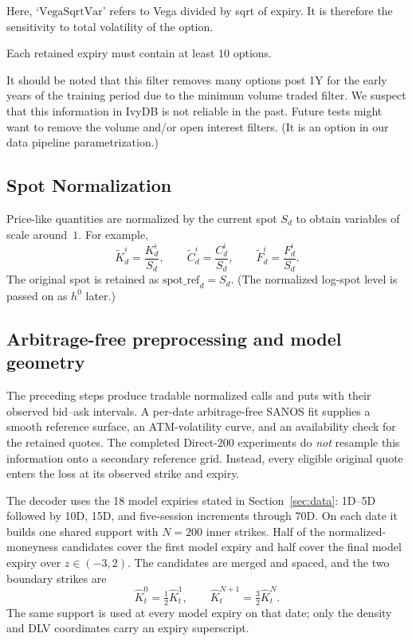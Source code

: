 \documentclass[11pt,a4paper]{article}
\begin{document}
Here, `$\mathrm{VegaSqrtVar}$' refers to Vega divided by sqrt of expiry. It is therefore
the sensitivity to total volatility of the option.

Each retained expiry must contain at least \(10\) options.

It should be noted that this filter removes many options post 1Y for the early years of the training period due to the minimum volume
traded filter. We suspect that this information in IvyDB is not reliable in the past.
Future tests might want to remove the volume and/or open interest filters. (It is an option
in our data pipeline parametrization.)

\subsection{Spot Normalization}

Price-like quantities are normalized by the current spot \(S_d\) to obtain
variables of scale around~$1$. For example,
%
\[
    \widetilde{K}_d^i
    =
    \frac{K_d^i}{S_d},
    \qquad
    \widetilde{C}_d^i
    =
    \frac{C_d^i}{S_d},
    \qquad
    \widetilde{F}_d^i
    =
    \frac{F_d^i}{S_d}.
\]
The original spot is retained as
$
    \mathrm{spot\_ref}_d = S_d.
$
(The normalized log-spot level is passed on as $h^0$ later.)

\subsection{Arbitrage-free preprocessing and model geometry}

The preceding steps produce tradable normalized calls and puts with their
observed bid--ask intervals.  A per-date arbitrage-free SANOS fit supplies a
smooth reference surface, an ATM-volatility curve, and an availability check
for the retained quotes.  The completed Direct-200 experiments do
\emph{not} resample this information onto a secondary reference grid.
Instead, every eligible original quote enters the loss at its observed strike
and expiry.

The decoder uses the 18 model expiries stated in Section~\ref{sec:data}:
1D--5D followed by 10D, 15D, and five-session increments through 70D.  On
each date it builds one shared support with $N=200$ inner strikes. Half of the normalized-moneyness
candidates cover the first model expiry and half cover the final model expiry
over $z\in(-3,2)$.  The candidates are merged and spaced, and the two boundary
strikes are
\[
  \hat K_t^0=\tfrac12\hat K_t^1,
  \qquad
  \hat K_t^{N+1}=\tfrac32\hat K_t^N.
\]
The same support is used at every model expiry on that date; only the density
and DLV coordinates carry an expiry superscript.
\end{document}
